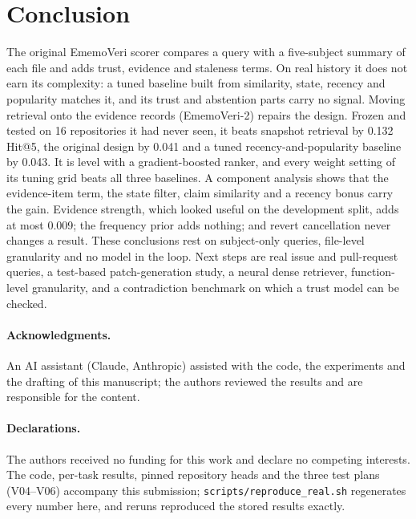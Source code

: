 \documentclass[runningheads]{llncs}
\newcommand{\sys}{EmemoVeri}
\begin{document}
\section{Conclusion}
The original \sys{} scorer compares a query with a five-subject summary of each file and adds trust, evidence and staleness terms. On real history it does not earn its complexity: a tuned baseline built from similarity, state, recency and popularity matches it, and its trust and abstention parts carry no signal. Moving retrieval onto the evidence records (\sys{}-2) repairs the design. Frozen and tested on 16 repositories it had never seen, it beats snapshot retrieval by 0.132 Hit@5, the original design by 0.041 and a tuned recency-and-popularity baseline by 0.043. It is level with a gradient-boosted ranker, and every weight setting of its tuning grid beats all three baselines. A component analysis shows that the evidence-item term, the state filter, claim similarity and a recency bonus carry the gain. Evidence strength, which looked useful on the development split, adds at most 0.009; the frequency prior adds nothing; and revert cancellation never changes a result. These conclusions rest on subject-only queries, file-level granularity and no model in the loop. Next steps are real issue and pull-request queries, a test-based patch-generation study, a neural dense retriever, function-level granularity, and a contradiction benchmark on which a trust model can be checked.

\paragraph{Acknowledgments.} An AI assistant (Claude, Anthropic) assisted with the code, the experiments and the drafting of this manuscript; the authors reviewed the results and are responsible for the content.

\paragraph{Declarations.} The authors received no funding for this work and declare no competing interests. The code, per-task results, pinned repository heads and the three test plans (V04--V06) accompany this submission; \texttt{scripts/reproduce\_real.sh} regenerates every number here, and reruns reproduced the stored results exactly.


{\footnotesize}
\end{document}
